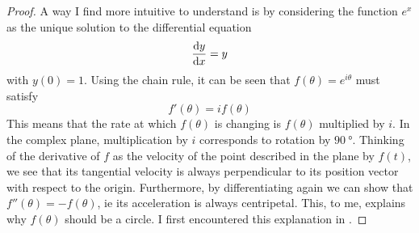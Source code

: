 \begin{proof}
 A way I find more intuitive to understand is by considering the function
 \(e^x\) as the unique solution to the differential equation
 \begin{equation*}
  \dv<y>{x} = y
 \end{equation*}
 with \(y(0) = 1\). Using the chain rule, it can be seen that
 \(f(\theta) = e^{i\theta}\) must satisfy
 \begin{equation*}
  f'(\theta) = if(\theta)
 \end{equation*}
 This means that the rate at which \(f(\theta)\) is changing is \(f(\theta)\)
 multiplied by \(i\). In the complex plane, multiplication by \(i\) corresponds
 to rotation by \(\SI{90}{\degree}\). Thinking of the derivative of \(f\) as the
 velocity of the point described in the plane by \(f(t)\), we see that its
 tangential velocity is always perpendicular to its position vector with respect
 to the origin. Furthermore, by differentiating again we can show that
 \(f''(\theta) = -f(\theta)\), ie its acceleration is always centripetal. This,
 to me, explains why \(f(\theta)\) should be a circle. I first encountered this
 explanation in \cite{3B1BEToTheIPi}.


\end{proof}

